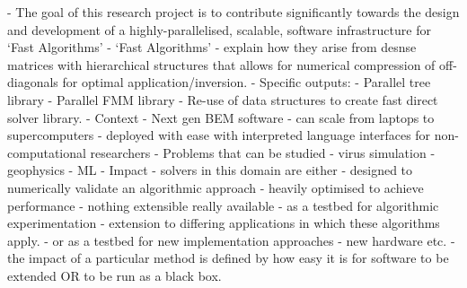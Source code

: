
- The goal of this research project is to contribute significantly towards the design and development of a highly-parallelised, scalable, software infrastructure for `Fast Algorithms'
    - `Fast Algorithms' - explain how they arise from desnse matrices with hierarchical structures that allows for numerical compression of off-diagonals for optimal application/inversion.
    - Specific outputs:
        - Parallel tree library
        - Parallel FMM library
        - Re-use of data structures to create fast direct solver library.
    - Context
        - Next gen BEM software
            - can scale from laptops to supercomputers
            - deployed with ease with interpreted language interfaces for non-computational researchers
        - Problems that can be studied
            - virus simulation
            - geophysics
            - ML
    - Impact
        - solvers in this domain are either
            - designed to numerically validate an algorithmic approach
            - heavily optimised to achieve performance
        - nothing extensible really available
            - as a testbed for algorithmic experimentation
            - extension to differing applications in which these algorithms apply.
            - or as a testbed for new implementation approaches
                - new hardware etc.
        - the impact of a particular method is defined by how easy it is for software to be extended OR to be run as a black box.
